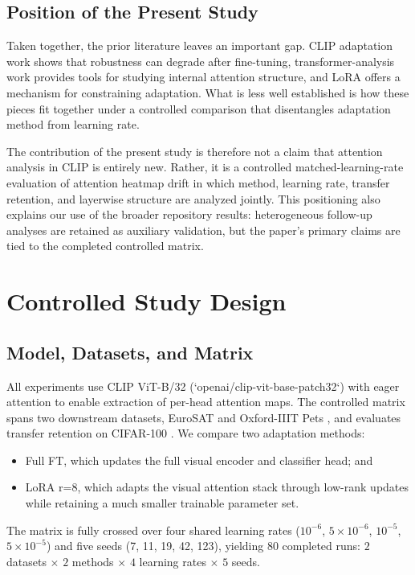 \documentclass[10pt]{article}
\begin{document}
\subsection{Position of the Present Study}
Taken together, the prior literature leaves an important gap. CLIP adaptation work shows that robustness can degrade after fine-tuning, transformer-analysis work provides tools for studying internal attention structure, and LoRA offers a mechanism for constraining adaptation. What is less well established is how these pieces fit together under a controlled comparison that disentangles adaptation method from learning rate.

The contribution of the present study is therefore not a claim that attention analysis in CLIP is entirely new. Rather, it is a controlled matched-learning-rate evaluation of attention heatmap drift in which method, learning rate, transfer retention, and layerwise structure are analyzed jointly. This positioning also explains our use of the broader repository results: heterogeneous follow-up analyses are retained as auxiliary validation, but the paper's primary claims are tied to the completed controlled matrix.

\section{Controlled Study Design}
\subsection{Model, Datasets, and Matrix}
All experiments use CLIP ViT-B/32 (`openai/clip-vit-base-patch32`) with eager attention to enable extraction of per-head attention maps. The controlled matrix spans two downstream datasets, EuroSAT \citep{helber2019eurosat} and Oxford-IIIT Pets \citep{parkhi2012cats}, and evaluates transfer retention on CIFAR-100 \citep{krizhevsky2009learning}. We compare two adaptation methods:
\begin{itemize}
    \item Full FT, which updates the full visual encoder and classifier head; and
    \item LoRA r=8, which adapts the visual attention stack through low-rank updates while retaining a much smaller trainable parameter set.
\end{itemize}

The matrix is fully crossed over four shared learning rates ($10^{-6}$, $5{\times}10^{-6}$, $10^{-5}$, $5{\times}10^{-5}$) and five seeds (7, 11, 19, 42, 123), yielding 80 completed runs: $2$ datasets $\times$ $2$ methods $\times$ $4$ learning rates $\times$ $5$ seeds.
\end{document}
